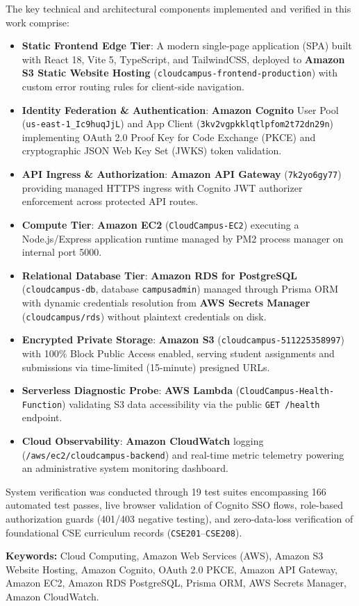 \vspace{0.3cm}
\noindent The key technical and architectural components implemented and verified in this work comprise:
\begin{itemize}[leftmargin=*,itemsep=2pt]
    \item \textbf{Static Frontend Edge Tier}: A modern single-page application (SPA) built with React 18, Vite 5, TypeScript, and TailwindCSS, deployed to \textbf{Amazon S3 Static Website Hosting} (\texttt{cloudcampus-frontend-production}) with custom error routing rules for client-side navigation.
    \item \textbf{Identity Federation \& Authentication}: \textbf{Amazon Cognito} User Pool (\texttt{us-east-1\_Ic9huqJjL}) and App Client (\texttt{3kv2vgpkklqtlpfom2t72dn29n}) implementing OAuth 2.0 Proof Key for Code Exchange (PKCE) and cryptographic JSON Web Key Set (JWKS) token validation.
    \item \textbf{API Ingress \& Authorization}: \textbf{Amazon API Gateway} (\texttt{7k2yo6gy77}) providing managed HTTPS ingress with Cognito JWT authorizer enforcement across protected API routes.
    \item \textbf{Compute Tier}: \textbf{Amazon EC2} (\texttt{CloudCampus-EC2}) executing a Node.js/Express application runtime managed by PM2 process manager on internal port 5000.
    \item \textbf{Relational Database Tier}: \textbf{Amazon RDS for PostgreSQL} (\texttt{cloudcampus-db}, database \texttt{campusadmin}) managed through Prisma ORM with dynamic credentials resolution from \textbf{AWS Secrets Manager} (\texttt{cloudcampus/rds}) without plaintext credentials on disk.
    \item \textbf{Encrypted Private Storage}: \textbf{Amazon S3} (\texttt{cloudcampus-511225358997}) with 100\% Block Public Access enabled, serving student assignments and submissions via time-limited (15-minute) presigned URLs.
    \item \textbf{Serverless Diagnostic Probe}: \textbf{AWS Lambda} (\texttt{CloudCampus-Health-Function}) validating S3 data accessibility via the public \texttt{GET /health} endpoint.
    \item \textbf{Cloud Observability}: \textbf{Amazon CloudWatch} logging (\texttt{/aws/ec2/cloudcampus-backend}) and real-time metric telemetry powering an administrative system monitoring dashboard.
\end{itemize}

\vspace{0.3cm}
\noindent System verification was conducted through 19 test suites encompassing 166 automated test passes, live browser validation of Cognito SSO flows, role-based authorization guards (401/403 negative testing), and zero-data-loss verification of foundational CSE curriculum records (\texttt{CSE201}--\texttt{CSE208}).

\vspace{0.6cm}
\noindent \textbf{\color{primaryblue}Keywords:} Cloud Computing, Amazon Web Services (AWS), Amazon S3 Website Hosting, Amazon Cognito, OAuth 2.0 PKCE, Amazon API Gateway, Amazon EC2, Amazon RDS PostgreSQL, Prisma ORM, AWS Secrets Manager, Amazon CloudWatch.

